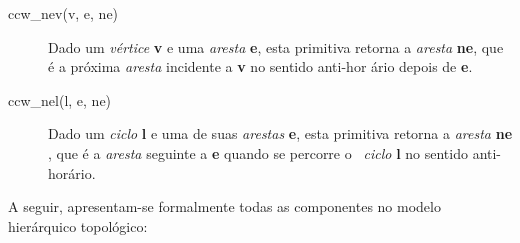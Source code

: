 \documentclass[12pt,a4paper]{book}
\begin{document}
\vspace{-2mm}

\begin{description}
\item[ccw\_nev(v, e, ne)] Dado um \textit{v\'{e}rtice} \textbf{v} e uma \textit{%
aresta} \textbf{e}, esta primitiva retorna a \textit{aresta} \textbf{ne}, que 
\'{e} a pr\'{o}xima \textit{aresta} incidente a \textbf{v} no sentido anti-hor%
\'{a}rio depois de \textbf{e}.

\item[ccw\_nel(l, e, ne)] Dado um \textit{ciclo} \textbf{l} e uma de suas 
\textit{arestas} \textbf{e}, esta primitiva retorna a \textit{aresta} \textbf{ne}%
, que \'{e} a \textit{aresta} seguinte a \textbf{e} quando se percorre o \textit{%
\ ciclo} \textbf{l} no sentido anti-hor\'{a}rio.
\end{description}

A seguir, apresentam-se formalmente todas as componentes no modelo hier\'{a}rquico topol\'{o}gico:
\end{document}
